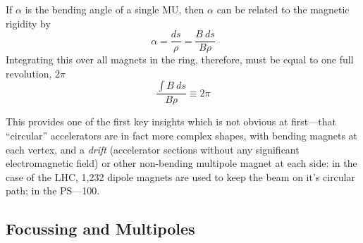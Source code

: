 \documentclass[11pt]{report}
\begin{document}
If $\alpha$ is the bending angle of a single MU, then $\alpha$ can be related to the magnetic rigidity by
\begin{equation}
\alpha=\frac{ds}\rho=\frac{B\ ds}{B\rho}
\end{equation}
Integrating this over all magnets in the ring, therefore, must be equal to one full revolution, $2\pi$
\begin{equation}
\frac{\int B\ ds}{B\rho}\equiv2\pi
\end{equation}

This provides one of the first key insights which is not obvious at first---that ``circular'' accelerators are in fact more complex shapes, with bending magnets at each vertex, and a \textit{drift} (accelerator sections without any significant electromagnetic field) or other non-bending multipole magnet at each side: in the case of the LHC, 1,232 dipole magnets are used to keep the beam on it's circular path; in the PS---100.

\subsection{Focussing and Multipoles}
\end{document}
